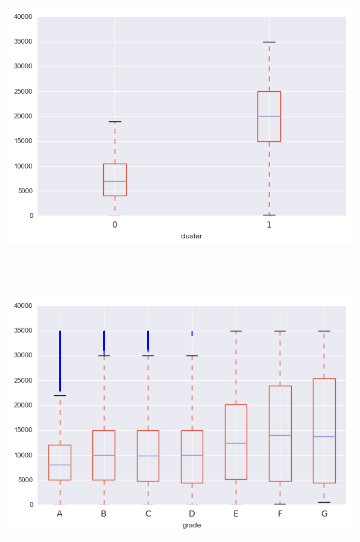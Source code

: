 \begin{anexosenv}
\begin{figure}[t!]
\begin{subfigure}[t]{0.5\textwidth}
            \centerline{\includegraphics[width=1.05\textwidth]{img/total_rec_prncp_by_cluster}}
        \end{subfigure}%
        ~ 
        \begin{subfigure}[t]{0.5\textwidth}
            \centering
   
            \centerline{\includegraphics[width=1.05\textwidth]{img/total_rec_prncp_by_grade}}

        \end{subfigure}
\end{figure}



\begin{figure}[t!]
    \centering
        \caption{total\textunderscore rec\textunderscore late\textunderscore fee }
        \begin{subfigure}[t]{0.5\textwidth}
            \centering


\end{subfigure}
\end{figure}
\end{anexosenv}
